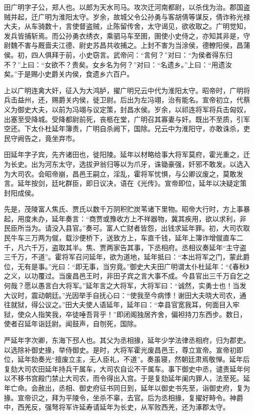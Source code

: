 \documentclass[12pt,UTF8]{ctexbook}
\begin{document}
田广明字子公，郑人也。以郎为天水司马。攻次迁河南都尉，以杀伐为治。郡国盗贼并起，迁广明为淮阳太守。岁余，故城父令公孙勇与客胡倩等谋反，倩诈称光禄大夫，从车骑数十，言使督盗贼，止陈留传舍，太守谒见，欲收取之。广明觉知，发兵皆捕斩焉。而公孙勇衣绣衣，乘驷马车至圉，圉使小史侍之，亦知其非是，守尉魏不害与厩啬夫江德、尉史苏昌共收捕之。上封不害为当涂侯，德轑阳侯，昌蒲侯。初，四人俱拜于前，小史窃言。武帝问：“言何？”对曰：“为侯者得东归不？”上曰：“女欲不？贵矣。女乡名为何？”对曰：“名遗乡。”上曰：“用遗汝矣。”于是赐小史爵关内侯，食遗乡六百户。



上以广明连禽大奸，征入为大鸿胪，擢广明兄云中代为淮阳太守。昭帝时，广明将兵击益州，还，赐爵关内侯，徙卫尉。后出为左冯翊，治有能名。宣帝初立，代蔡义为御史大夫，以前为冯翊与议定策，封昌水侯。岁余，以祁连将军将兵击匈奴，出塞至受降城。受降都尉前死，丧柩在堂，广明召其寡妻与奸。既出不至质，引军空还。下太仆杜延年簿责，广明自杀阙下，国除。兄云中为淮阳守，亦敢诛杀，吏民守阙告之，竟坐弃市。



田延年字子宾，先齐诸田也，徙阳陵。延年以材略给事大将军莫府，霍光重之，迁为长史。出为河东太守，选拔尹翁归等以为爪牙，诛锄豪强，奸邪不敢发。以选入为大司农。会昭帝崩，昌邑王嗣立，淫乱，霍将军忧惧，与公卿议废之，莫敢发言。延年按剑，廷叱群臣，即日议决，语在《光传》。宣帝即位，延年以决疑定策封阳成侯。



先是，茂陵富人焦氏、贾氏以数千万阴积贮炭苇诸下里物。昭帝大行时，方上事暴起，用度未办，延年奏言：“商贾或豫收方上不祥器物，冀其疾用，欲以求利，非民臣所当为。请没入县官。”奏可。富人亡财者皆怨，出钱求延年罪。初，大司农取民牛车三万两为僦，载沙便桥下，送致方上，车直千钱，延年上簿诈增僦直车二千，凡六千万，盗取其半。焦、贾两家告其事，下丞相府。丞相议奏延年“主守盗三千万，不道”。霍将军召问延年，欲为道地，延年抵曰：“本出将军之门，蒙此爵位，无有是事。”光曰：“即无事，当穷竟。”御史大夫田广明谓太仆杜延年：“《春秋》之义，以功覆过。当废昌邑王时，非田子宾之言大事不成。今县官出三千万自乞之何哉？愿以愚言白大将军。”延年言之大将军，大将军曰：“诚然，实勇士也！当发大议时，震动朝廷。”光因举手自抚心曰：“使我至今病悸！谢田大夫晓大司农，通往就狱，得公议之。”田大夫使人语延年，延年曰：“幸县官宽我耳，何面目入牢狱，使众人指笑我，卒徒唾吾背乎！”即闭阁独居齐舍，偏袒持刀东西步。数日，使者召延年诣廷尉。闻鼓声，自刎死，国除。



严延年字次卿，东海下邳人也。其父为丞相掾，延年少学法律丞相府，归为郡吏。以选除补御史掾，举侍御史。是时，大将军霍光废昌邑王，尊立宣帝。宣帝初即位，延年劾奏光“擅废立主，无人臣礼，不道”。奏虽寝，然朝廷肃焉敬惮。延年后复劾大司农田延年持兵干属车，大司农自讼不干属车。事下御史中丞，谴责延年何以不移书宫殿门禁止大司农，而令得出入宫。于是复劾延年阑内罪人，法至死。延年亡命。会赦出，丞相、御史府征书同日到，延年以御史书先至，诣御史府，复为掾。宣帝识之，拜为平陵令，坐杀不辜，去官。后为丞相掾，复擢好畤令。神爵中，西羌反，强弩将军许延寿请延年为长史，从军败西羌，还为涿郡太守。
\end{document}
